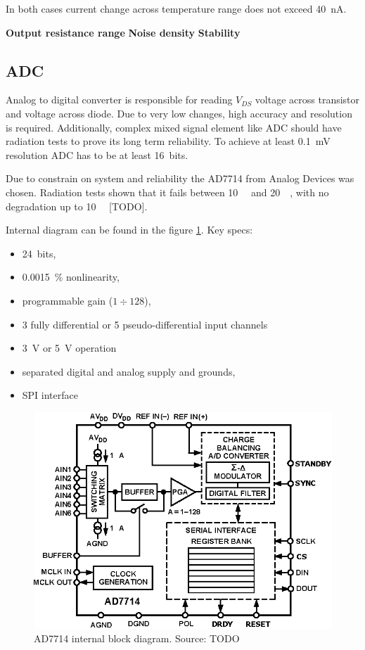        In both cases current change across temperature range does not exceed \SI{40}{\nano\ampere}.

        \bigskip\textbf{Output resistance range}
        \bigskip\textbf{Noise density}
        \bigskip\textbf{Stability}

    \subsection{ADC}
        Analog to digital converter is responsible for reading $V_{DS}$ voltage across transistor and voltage across diode. Due to very low changes, high accuracy and resolution is required. Additionally, complex mixed signal element like ADC should have radiation tests to prove its long term reliability. To achieve at least \SI{0.1}{\milli\volt} resolution ADC has to be at least \SI{16}{bits}.

        Due to constrain on system and reliability the AD7714 from Analog Devices was chosen. Radiation tests shown that it fails between \SI{10}{\kilo\rad} and \SI{20}{\kilo\rad}, with no degradation up to \SI{10}{\kilo\rad} [TODO].

        Internal diagram can be found in the figure \ref{AD7714}. Key specs:
        \begin{itemize}
            \item \SI{24}{bits},
            \item \SI{0.0015}{\percent} nonlinearity,
            \item programmable gain ($1 \div 128$),
            \item 3 fully differential or 5 pseudo-differential input channels
            \item \SI{3}{\volt} or \SI{5}{\volt} operation
            \item separated digital and analog supply and grounds,
            \item SPI interface
        \end{itemize}

        \begin{figure}[H]
            \centering
            \includegraphics[width=0.5\paperwidth]{img/06/AD7714.eps}
            \caption{AD7714 internal block diagram. Source: TODO}
            \label{AD7714}
        \end{figure}

